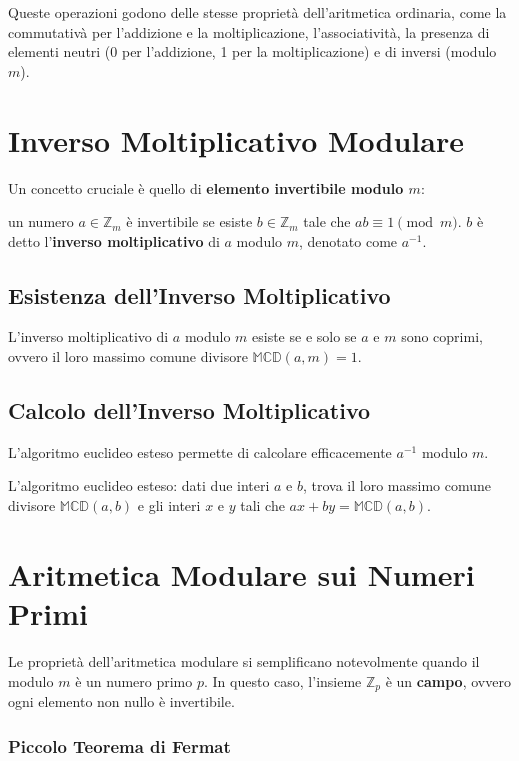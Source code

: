 \documentclass[a4paper,12pt]{report}
\begin{document}
Queste operazioni godono delle stesse proprietà dell'aritmetica ordinaria, come la commutativà per l'addizione e la moltiplicazione, l'associatività, la presenza di elementi neutri (0 per l'addizione, 1 per la moltiplicazione) e di inversi (modulo $m$).

\section{Inverso Moltiplicativo Modulare}

Un concetto cruciale è quello di \textbf{elemento invertibile modulo $m$}: 

un numero $a \in \mathbb{Z}_m$ è invertibile se esiste $b \in \mathbb{Z}_m$ tale che $ab \equiv 1 \pmod{m}$. $b$ è detto l'\textbf{inverso moltiplicativo} di $a$ modulo $m$, denotato come $a^{-1}$.

\subsection*{Esistenza dell'Inverso Moltiplicativo}
L'inverso moltiplicativo di $a$ modulo $m$ esiste se e solo se $a$ e $m$ sono coprimi, ovvero il loro massimo comune divisore $\mathbb{MCD}(a,m) = 1$. 

\subsection*{Calcolo dell'Inverso Moltiplicativo}
L'algoritmo euclideo esteso permette di calcolare efficacemente $a^{-1}$ modulo $m$.

L'algoritmo euclideo esteso: dati due interi $a$ e $b$, trova il loro massimo comune divisore $\mathbb{MCD}(a,b)$ e gli interi $x$ e $y$ tali che $ax + by = \mathbb{MCD}(a,b)$.

\section{Aritmetica Modulare sui Numeri Primi}

Le proprietà dell'aritmetica modulare si semplificano notevolmente quando il modulo $m$ è un numero primo $p$. In questo caso, l'insieme $\mathbb{Z}_p$ è un \textbf{campo}, ovvero ogni elemento non nullo è invertibile.

\subsubsection*{Piccolo Teorema di Fermat}
\end{document}
